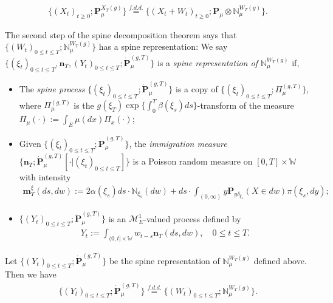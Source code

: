 \begin{thm}\label{thm: size-biased decomposition}
\begin{align}
	\{(X_t)_{t\geq 0}; \mathbf P_\mu^{X_T(g)}\}
	\overset{f.d.d.}{=} \{(X_t+W_t)_{t\geq 0}; \mathbf P_\mu  \otimes \mathbb N^{W_T(g)}_\mu\}.
\end{align}
\end{thm}
	The second step of the spine decomposition theorem
	says that $\{(W_t)_{0\leq t\leq T}; \mathbb N^{W_T(g)}_\mu\}$ has a spine representation:
	We say $\{(\xi_t)_{0\leq t\leq T}, \mathbf n_T,  (Y_t)_{ 0\leq t\leq T}; \dot {\mathbf P}^{(g,T)}_\mu\}$ is a \emph{spine representation of $\mathbb N^{W_T(g)}_\mu$}  if,
\begin{itemize}
\item
	The \emph{spine process} $\{(\xi_t)_{0\leq t\leq T}; \dot{\mathbf P}^{(g,T)}_\mu\}$ is a copy of $\{(\xi_t)_{0\leq t\leq T}; \Pi^{(g,T)}_{\mu}\}$, 
	where $\Pi^{(g,T)}_{\mu}$ is the $g(\xi_T) \exp\{\int_0^T \beta(\xi_s)ds\}$-transform
	of the measure $\Pi_{\mu}(\cdot):=\int_{E}\mu(dx)\Pi_x(\cdot) $;
\item
	Given $\{(\xi_t)_{0\leq t\leq T}; \dot{\mathbf P}^{(g,T)}_\mu\}$, the \emph{immigration measure} $\{\mathbf n_T; \dot{\mathbf P}^{(g,T)}_\mu[\cdot |(\xi_t)_{0\leq t\leq T}]\}$ is a Poisson random measure on $[0,T] \times \mathbb W$ with intensity
\begin{align}
	\mathbf m^\xi_T(ds,dw)
	:= 2 \alpha(\xi_s) ds \cdot \mathbb N_{\xi_s}(dw) + ds \cdot \int_{(0,\infty)} y \mathbf P_{y\delta_{\xi_s}}(X\in dw) \pi(\xi_s,dy);
\end{align}
\item
	$\{(Y_t)_{0\leq t\leq T}; \dot{\mathbf P}^{(g,T)}_\mu\}$ is an $\mathcal M^1_E$-valued process defined by
\begin{align}
	Y_t
	:= \int_{(0,t] \times \mathbb W} w_{t-s} \mathbf n_T(ds,dw),
	\quad 0 \leq t\leq T.
\end{align}
\end{itemize}

\begin{thm}\label{thm: spine representation}
	Let $\{(Y_t)_{0\leq t\leq T}; \dot {\mathbf P}^{(g,T)}_\mu\}$ be the spine representation of $\mathbb N^{W_T(g)}_\mu$ defined above.
	Then we have
\begin{align}
	\{(Y_t)_{0\leq t\leq T}; \dot{\mathbf P}^{(g,T)}_\mu\}
	\overset{f.d.d.}{=} \{(W_t)_{0\leq t\leq T}; \mathbb N_\mu^{W_T(g)}\}.
\end{align}
\end{thm}

